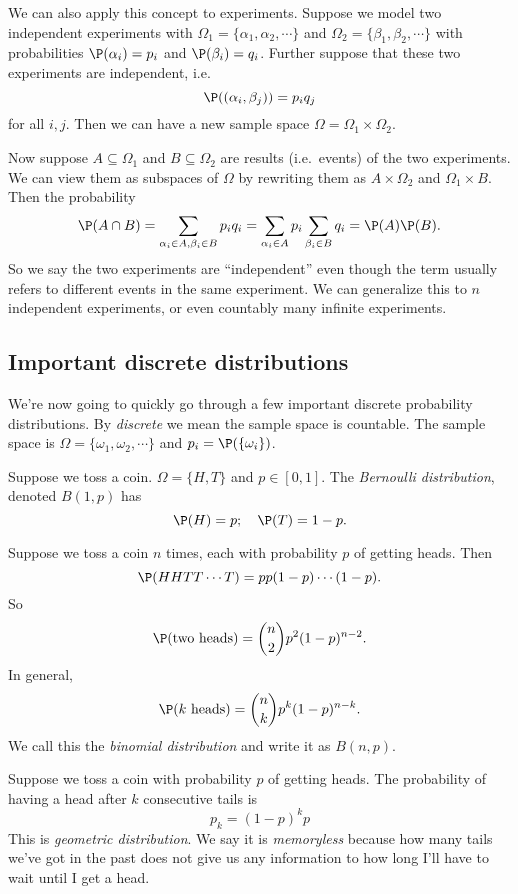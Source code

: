 \documentclass[a4paper]{article}
\begin{document}
We can also apply this concept to experiments. Suppose we model two independent experiments with $\Omega_1 = \{\alpha_1, \alpha_2, \cdots\}$ and $\Omega_2 = \{\beta_1, \beta_2, \cdots\}$ with probabilities $\P(\alpha_i) = p_i$ and $\P(\beta_i) = q_i$. Further suppose that these two experiments are independent, i.e.
\[
  \P((\alpha_i, \beta_j)) = p_iq_j
\]
for all $i, j$. Then we can have a new sample space $\Omega = \Omega_1\times \Omega_2$.

Now suppose $A\subseteq \Omega_1$ and $B\subseteq \Omega_2$ are results (i.e.\ events) of the two experiments. We can view them as subspaces of $\Omega$ by rewriting them as $A\times \Omega_2$ and $\Omega_1\times B$. Then the probability
\[
  \P(A\cap B) = \sum_{\alpha_i\in A, \beta_i\in B} p_iq_i = \sum_{\alpha_i\in A} p_i\sum_{\beta_i\in B}q_i = \P(A)\P(B).
\]
So we say the two experiments are ``independent'' even though the term usually refers to different events in the same experiment. We can generalize this to $n$ independent experiments, or even countably many infinite experiments.


\subsection{Important discrete distributions}
We're now going to quickly go through a few important discrete probability distributions. By \emph{discrete} we mean the sample space is countable. The sample space is $\Omega = \{\omega_1, \omega_2, \cdots\}$ and $p_i = \P(\{\omega_i\})$.

\begin{defi}
  Suppose we toss a coin. $\Omega=\{H, T\}$ and $p\in [0, 1]$. The \emph{Bernoulli distribution}, denoted $B(1, p)$ has
  \[
    \P(H) = p;\quad \P(T) = 1- p.
  \]
\end{defi}

\begin{defi}
  Suppose we toss a coin $n$ times, each with probability $p$ of getting heads. Then
  \[
    \P(HHTT\cdots T) = pp(1 - p)\cdots (1 - p).
  \]
  So
  \[
    \P(\text{two heads}) = \binom{n}{2}p^2(1 - p)^{n -2}.
  \]
  In general,
  \[
    \P(k\text{ heads}) = \binom{n}{k}p^k(1 - p)^{n - k}.
  \]
  We call this the \emph{binomial distribution} and write it as $B(n, p)$.
\end{defi}

\begin{defi}
  Suppose we toss a coin with probability $p$ of getting heads. The probability of having a head after $k$ consecutive tails is
  \[
    p_k = (1- p)^k p
  \]
  This is \emph{geometric distribution}. We say it is \emph{memoryless} because how many tails we've got in the past does not give us any information to how long I'll have to wait until I get a head.
\end{defi}
\end{document}
